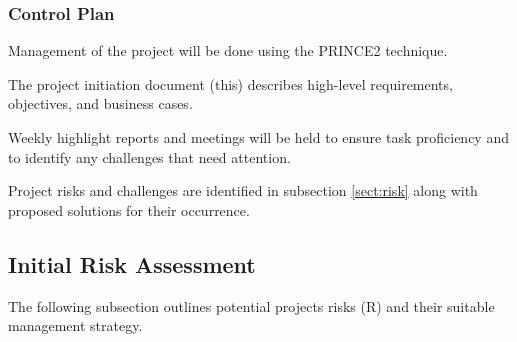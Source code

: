 \subsubsection*{Control Plan}
Management of the project will be done using the PRINCE2 technique. 

The project initiation document (this) describes high-level requirements, objectives, and business cases.

Weekly highlight reports and meetings will be held to ensure task proficiency and to identify any challenges that need attention.

Project risks and challenges are identified in subsection \ref{sect:risk} along with proposed solutions for their occurrence.

\newpage
\subsection*{Initial Risk Assessment}\label{sect:risk}
The following subsection outlines potential projects risks (R) and their suitable management strategy.

